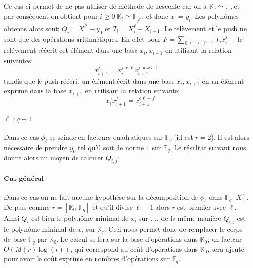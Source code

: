 \documentclass[10pt,a4paper]{book}
\theoremstyle{plain}
\theoremstyle{definition}
\theoremstyle{definition}
\theoremstyle{definition}
\newtheorem{prop}[thm]{Proposition}
\theoremstyle{definition}
\theoremstyle{remark}
\theoremstyle{remark}
\begin{document}
Ce cas-ci permet de ne pas utiliser de méthode de descente car on a $\mathbb{K}_0 \simeq \mathbb{F}_q$ et par conséquent on obtient pour $i \geqslant 0 $   $\mathbb{K}_i \simeq \mathbb{F}_{q^{\ell^i}}$, et donc $x_i=y_i$. Les polynômes obtenus alors sont: $Q_i=X^{\ell^i}-y_0$ et $T_i=X_i^{\ell}-X_{i-1}$. Le relèvement et le push ne sont que des opérations arithmétiques. En effet pour $F=\sum_{0 \leqslant j \leqslant \ell^{i+1}}f_jx_{i+1}^j$ le relévement réécrit cet élément dans une base $x_i,x_{i+1}$ en utilisant la relation suivantes:
\begin{equation*}
x_{i+1}^j=x_i^{j \div \ell}x_{i+1}^{j \bmod \ell} 
\end{equation*}
tandis que le push réécrit un élément écrit dans une base $x_i, x_{i+1}$ en un élément exprimé dans la base $x_{i+1}$ en utilisant la relation suivante:
\begin{equation*}
\quad x_i^ex_{i+1}^f=x_{i+1}^{e\ell + f} 
\end{equation*}

\paragraph{$\ell \nmid q+1$}
Dans ce cas $\phi_{\ell}$ se scinde en facteurs quadratiques sur $\mathbb{F}_q$ (id est $r=2$). Il est alors nécessaire de prendre $y_0$ tel qu'il soit de norme $1$ sur $\mathbb{F}_q$. Le résultat suivant nous donne alors un moyen de calculer $Q_{i,j}$:
%

\paragraph{Cas général}
Dans ce cas on ne fait aucune hypothèse sur la décomposition de $\phi_{\ell}$ dans $\mathbb{F}_q[X]$. De plus comme $r=[\mathbb{K}_0:\mathbb{F}_q]$ et qu'il divise $\ell-1$ alors $r$ est premier avec $\ell$. Ainsi $Q_i$ est bien le polynôme minimal de $x_i$ sur $\mathbb{F}_q$, de la même manière $Q_{i,j}$ est le polynôme minimal de $x_i$ sur $\mathbb{K}_j$. Ceci nous permet donc de remplacer le corps de base $\mathbb{F}_q$ par $\mathbb{K}_0$. Le calcul se fera sur la base d'opérations dans $\mathbb{K}_0$, un facteur $O(M(r)\log(r))$, qui correspond au coût d'opérations dans $\mathbb{K}_0$, sera ajouté pour avoir le coût exprimé en nombres d'opérations sur $\mathbb{F}_q$.
\end{document}
